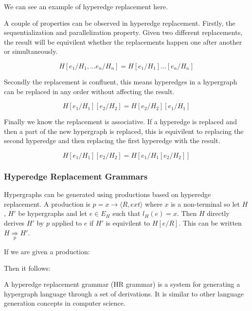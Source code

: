    We can see an example of hyperedge replacement here.
    
    

    A couple of properties can be observed in hyperedge replacement. Firstly, the sequentialization and parallelization property. Given two different replacements, the result will be equivilent whether the replacements happen one after another or simultaneously.

    \begin{equation}
    H[e_1/H_1,...e_n/H_n] = H[e_1/H_1]...[e_n/H_n]
    \end{equation}

    Secondly the replacement is confluent, this means hyperedges in a hypergraph can be replaced in any order without affecting the result.

    \begin{equation}
    H[e_1/H_1][e_2/H_2] = H[e_2/H_2][e_1/H_1]
    \end{equation}

    Finally we know the replacement is associative. If a hyperedge is replaced and then a part of the new hypergraph is replaced, this is equivilent to replacing the second hyperedge and then replacing the first hyperedge with the result.

    \begin{equation}
    H[e_1/H_1][e_2/H_2] = H[e_1/H_1 [e_2/H_2]]
    \end{equation}

  \subsubsection{Hyperedge Replacement Grammars}

    Hypergraphs can be generated using productions based on hyperedge replacement. A production is $p = x \to \langle R, ext \rangle$ where $x$ is a non-terminal so let $H$, $H'$ be hypergraphs and let $e \in E_H$ such that $l_{H}(e) = x$. Then $H$ directly derives $H'$ by $p$ applied to $e$ if $H'$ is equivilent to $H[e / R]$. This can be written $H \underset{p}{\Rightarrow} H'$.

    If we are given a production:
    

    Then it follows:
    

    A hyperedge replacement grammar (HR grammar) is a system for generating a hypergraph language through a set of derivations. It is similar to other language generation concepts in computer science.

